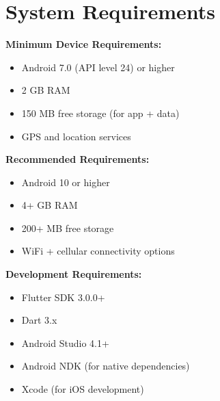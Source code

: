 \documentclass[12pt,a4paper,oneside]{report}
\begin{document}
\chapter{System Requirements}
\label{app:requirements}

\textbf{Minimum Device Requirements:}

\begin{itemize}
\item Android 7.0 (API level 24) or higher
\item 2 GB RAM
\item 150 MB free storage (for app + data)
\item GPS and location services
\end{itemize}

\textbf{Recommended Requirements:}

\begin{itemize}
\item Android 10 or higher
\item 4+ GB RAM
\item 200+ MB free storage
\item WiFi + cellular connectivity options
\end{itemize}

\textbf{Development Requirements:}

\begin{itemize}
\item Flutter SDK 3.0.0+
\item Dart 3.x
\item Android Studio 4.1+
\item Android NDK (for native dependencies)
\item Xcode (for iOS development)
\end{itemize}

\end{document}
